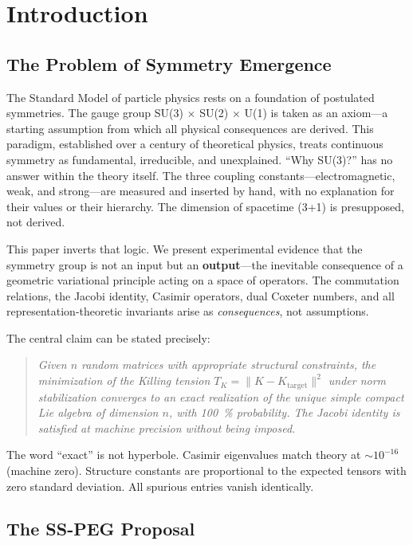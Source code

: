 \section{Introduction}\label{sec:introduction}

\subsection{The Problem of Symmetry Emergence}\label{sec:problem}

The Standard Model of particle physics rests on a foundation of postulated symmetries. The gauge group SU(3) $\times$ SU(2) $\times$ U(1) is taken as an axiom---a starting assumption from which all physical consequences are derived. This paradigm, established over a century of theoretical physics, treats continuous symmetry as fundamental, irreducible, and unexplained. ``Why SU(3)?'' has no answer within the theory itself. The three coupling constants---electromagnetic, weak, and strong---are measured and inserted by hand, with no explanation for their values or their hierarchy. The dimension of spacetime (3+1) is presupposed, not derived.

This paper inverts that logic. We present experimental evidence that the symmetry group is not an input but an \textbf{output}---the inevitable consequence of a geometric variational principle acting on a space of operators. The commutation relations, the Jacobi identity, Casimir operators, dual Coxeter numbers, and all representation-theoretic invariants arise as \textit{consequences}, not assumptions.

The central claim can be stated precisely:

\begin{quote}
\emph{Given $n$ random matrices with appropriate structural constraints, the minimization of the Killing tension $T_K = \|K - K_{\mathrm{target}}\|^2$ under norm stabilization converges to an exact realization of the unique simple compact Lie algebra of dimension $n$, with \SI{100}{\percent} probability. The Jacobi identity is satisfied at machine precision without being imposed.}
\end{quote}

The word ``exact'' is not hyperbole. Casimir eigenvalues match theory at $\sim 10^{-16}$ (machine zero). Structure constants are proportional to the expected tensors with zero standard deviation. All spurious entries vanish identically.

\subsection{The SS-PEG Proposal}\label{sec:sspeg}

